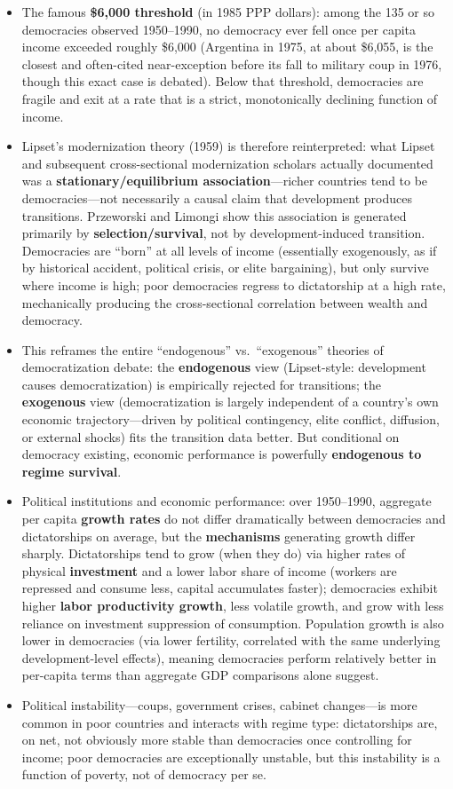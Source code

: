 \documentclass[12pt]{article}
\begin{document}
\begin{itemize}[leftmargin=*, itemsep=4pt]
    \item The famous \textbf{\$6,000 threshold} (in 1985 PPP dollars): among the 135 or so democracies observed 1950--1990, no democracy ever fell once per capita income exceeded roughly \$6,000 (Argentina in 1975, at about \$6,055, is the closest and often-cited near-exception before its fall to military coup in 1976, though this exact case is debated). Below that threshold, democracies are fragile and exit at a rate that is a strict, monotonically declining function of income.
    \item Lipset's modernization theory (1959) is therefore reinterpreted: what Lipset and subsequent cross-sectional modernization scholars actually documented was a \textbf{stationary/equilibrium association}---richer countries tend to be democracies---not necessarily a causal claim that development produces transitions. Przeworski and Limongi show this association is generated primarily by \textbf{selection/survival}, not by development-induced transition. Democracies are ``born'' at all levels of income (essentially exogenously, as if by historical accident, political crisis, or elite bargaining), but only survive where income is high; poor democracies regress to dictatorship at a high rate, mechanically producing the cross-sectional correlation between wealth and democracy.
    \item This reframes the entire ``endogenous'' vs.\ ``exogenous'' theories of democratization debate: the \textbf{endogenous} view (Lipset-style: development causes democratization) is empirically rejected for transitions; the \textbf{exogenous} view (democratization is largely independent of a country's own economic trajectory---driven by political contingency, elite conflict, diffusion, or external shocks) fits the transition data better. But conditional on democracy existing, economic performance is powerfully \textbf{endogenous to regime survival}.
    \item Political institutions and economic performance: over 1950--1990, aggregate per capita \textbf{growth rates} do not differ dramatically between democracies and dictatorships on average, but the \textbf{mechanisms} generating growth differ sharply. Dictatorships tend to grow (when they do) via higher rates of physical \textbf{investment} and a lower labor share of income (workers are repressed and consume less, capital accumulates faster); democracies exhibit higher \textbf{labor productivity growth}, less volatile growth, and grow with less reliance on investment suppression of consumption. Population growth is also lower in democracies (via lower fertility, correlated with the same underlying development-level effects), meaning democracies perform relatively better in per-capita terms than aggregate GDP comparisons alone suggest.
    \item Political instability---coups, government crises, cabinet changes---is more common in poor countries and interacts with regime type: dictatorships are, on net, not obviously more stable than democracies once controlling for income; poor democracies are exceptionally unstable, but this instability is a function of poverty, not of democracy per se.
\end{itemize}
\end{document}

